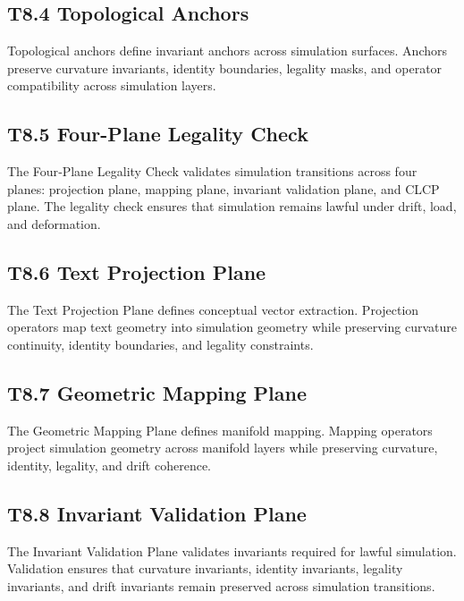 \subsection{T8.4 Topological Anchors}
Topological anchors define invariant anchors across simulation surfaces.
Anchors preserve curvature invariants, identity boundaries, legality masks, and
operator compatibility across simulation layers.

\subsection{T8.5 Four-Plane Legality Check}
The Four‑Plane Legality Check validates simulation transitions across four
planes: projection plane, mapping plane, invariant validation plane, and CLCP
plane. The legality check ensures that simulation remains lawful under drift,
load, and deformation.

\subsection{T8.6 Text Projection Plane}
The Text Projection Plane defines conceptual vector extraction. Projection
operators map text geometry into simulation geometry while preserving curvature
continuity, identity boundaries, and legality constraints.

\subsection{T8.7 Geometric Mapping Plane}
The Geometric Mapping Plane defines manifold mapping. Mapping operators project
simulation geometry across manifold layers while preserving curvature,
identity, legality, and drift coherence.

\subsection{T8.8 Invariant Validation Plane}
The Invariant Validation Plane validates invariants required for lawful
simulation. Validation ensures that curvature invariants, identity invariants,
legality invariants, and drift invariants remain preserved across simulation
transitions.

